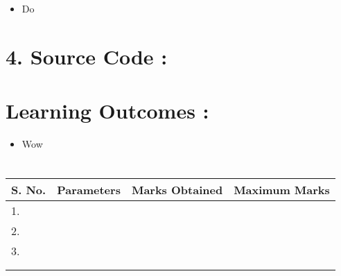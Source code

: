 \documentclass[14pt]{extarticle}
\begin{document}
\begin{itemize}
  \item Do
\end{itemize}

\newpage
\section*{\normalsize 4. Source Code :}





\section*{\normalsize Learning Outcomes :}

  \begin{itemize}
    \item Wow
  \end{itemize}

\section*{}

\begin{center}

\begin{tabular}{ |p{2.5cm}|p{4cm}|p{5cm}|p{5cm}|}
 \hline
 S. No. & Parameters & Marks Obtained & Maximum Marks \\
 \hline
 1.&&&\\
 \hline
 2.&&&\\
 \hline
 3.&&&\\
 \hline
 &&&\\
 &&&\\
 \hline
\end{tabular}
\end{center}
\end{document}
